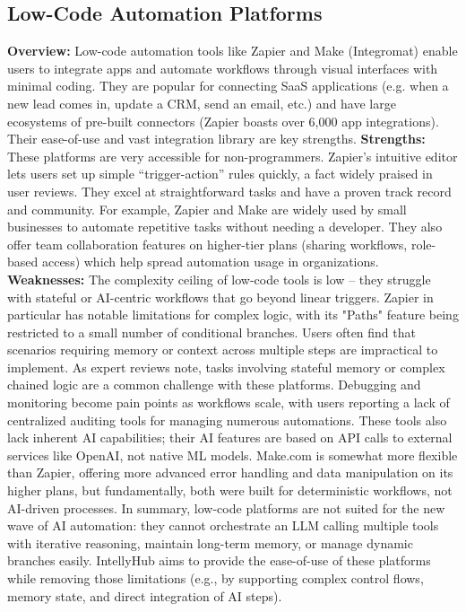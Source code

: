 \subsection{Low-Code Automation Platforms}

\textbf{Overview:} Low-code automation tools like Zapier and Make (Integromat) enable users to integrate apps and automate workflows through visual interfaces with minimal coding. They are popular for connecting SaaS applications (e.g. when a new lead comes in, update a CRM, send an email, etc.) and have large ecosystems of pre-built connectors (Zapier boasts over 6,000 app integrations\cite{zapierApps}). Their ease-of-use and vast integration library are key strengths.
\newline\newline
\textbf{Strengths:} These platforms are very accessible for non-programmers. Zapier's intuitive editor lets users set up simple “trigger-action” rules quickly, a fact widely praised in user reviews\cite{g2ZapierReviews}. They excel at straightforward tasks and have a proven track record and community. For example, Zapier and Make are widely used by small businesses to automate repetitive tasks without needing a developer. They also offer team collaboration features on higher-tier plans (sharing workflows, role-based access) which help spread automation usage in organizations\cite{zapierPricing}.
\newline\newline
\textbf{Weaknesses:} The complexity ceiling of low-code tools is low – they struggle with stateful or AI-centric workflows that go beyond linear triggers. Zapier in particular has notable limitations for complex logic, with its "Paths" feature being restricted to a small number of conditional branches. Users often find that scenarios requiring memory or context across multiple steps are impractical to implement. As expert reviews note, tasks involving stateful memory or complex chained logic are a common challenge with these platforms. Debugging and monitoring become pain points as workflows scale, with users reporting a lack of centralized auditing tools for managing numerous automations\cite{g2ZapierReviews}. These tools also lack inherent AI capabilities; their AI features are based on API calls to external services like OpenAI, not native ML models\cite{zapierOpenAI}. Make.com is somewhat more flexible than Zapier, offering more advanced error handling and data manipulation on its higher plans\cite{g2MakeVsZapier}, but fundamentally, both were built for deterministic workflows, not AI-driven processes. In summary, low-code platforms are not suited for the new wave of AI automation: they cannot orchestrate an LLM calling multiple tools with iterative reasoning, maintain long-term memory, or manage dynamic branches easily. IntellyHub aims to provide the ease-of-use of these platforms while removing those limitations (e.g., by supporting complex control flows, memory state, and direct integration of AI steps).

